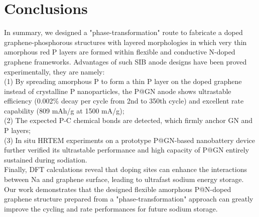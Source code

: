 \section{Conclusions}
In summary, we designed a "phase-transformation" route to fabricate a doped graphene-phosphorous structures with layered morphologies in which very thin amorphous red P layers are formed within flexible and conductive N-doped graphene frameworks. Advantages of such SIB anode designs have been proved experimentally, they are namely: \\
(1) By spreading amorphous P to form a thin P layer on the doped graphene instead of crystalline P nanoparticles, the P@GN anode shows ultrastable efficiency (0.002\% decay per cycle from 2nd to 350th cycle) and excellent rate capability (809 mAh/g at 1500 mA/g); \\
(2) The expected P-C chemical bonds are detected, which firmly anchor GN and P layers; \\
(3) In situ HRTEM experiments on a prototype P@GN-based nanobattery device further verified its ultrastable performance and high capacity of P@GN entirely sustained during sodiation.\\
Finally, DFT calculations reveal that doping sites can enhance the interactions between Na and graphene surface, leading to ultrafast sodium energy storage. Our work demonstrates that the designed flexible amorphous P@N-doped graphene structure prepared from a "phase-transformation" approach can greatly improve the cycling and rate performances for future sodium storage. 



